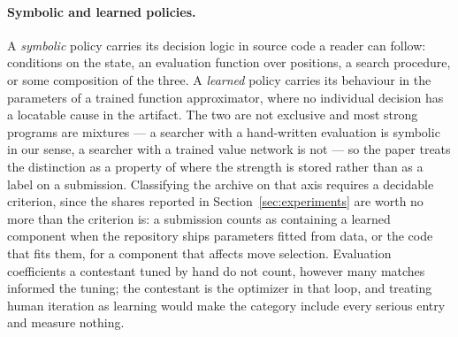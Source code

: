 \paragraph{Symbolic and learned policies.}
A \emph{symbolic} policy carries its decision logic in source code a reader can
follow: conditions on the state, an evaluation function over positions, a search
procedure, or some composition of the three. A \emph{learned} policy carries its
behaviour in the parameters of a trained function approximator, where no
individual decision has a locatable cause in the artifact. The two are not
exclusive and most strong programs are mixtures --- a searcher with a
hand-written evaluation is symbolic in our sense, a searcher with a trained value
network is not --- so the paper treats the distinction as a property of where the
strength is stored rather than as a label on a submission. Classifying the archive
on that axis requires a decidable criterion, since the shares reported in
Section~\ref{sec:experiments} are worth no more than the criterion is: a
submission counts as containing a learned component when the repository ships
parameters fitted from data, or the code that fits them, for a component that
affects move selection. Evaluation coefficients a contestant tuned by hand do not
count, however many matches informed the tuning; the contestant is the optimizer
in that loop, and treating human iteration as learning would make the category
include every serious entry and measure nothing.

